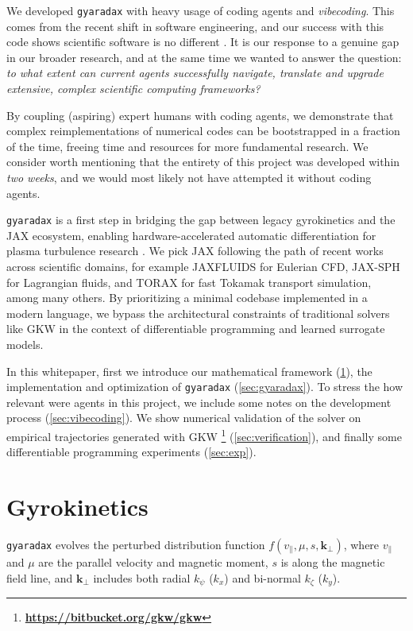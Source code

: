 \documentclass{article}
\theoremstyle{plain}
\theoremstyle{definition}
\theoremstyle{remark}
\begin{document}
We developed \texttt{gyaradax} with heavy usage of coding agents \cite{yang2024sweagentagentcomputerinterfacesenable} and \textit{vibecoding}. This comes from the recent shift in software engineering, and our success with this code shows scientific software is no different \cite{chen2025scienceagentbenchrigorousassessmentlanguage,duston2025ainsteinbenchbenchmarkingcodingagents}.
%
It is our response to a genuine gap in our broader research, and at the same time we wanted to answer the question: \textit{to what extent can current agents successfully navigate, translate and upgrade extensive, complex scientific computing frameworks?}

By coupling (aspiring) expert humans with coding agents, we demonstrate that complex reimplementations of numerical codes can be bootstrapped in a fraction of the time, freeing time and resources for more fundamental research.
%
We consider worth mentioning that the entirety of this project was developed within \textit{two weeks}, and we would most likely not have attempted it without coding agents.

\texttt{gyaradax} is a first step in bridging the gap between legacy gyrokinetics and the JAX ecosystem, enabling hardware-accelerated automatic differentiation for plasma turbulence research \cite{galletti20255dneuralsurrogatesnonlinear, paischer2025gyroswin}.
%
We pick JAX following the path of recent works across scientific domains, for example JAXFLUIDS \cite{Bezgin2023} for Eulerian CFD, JAX-SPH \cite{toshev2024jax} for Lagrangian fluids, and TORAX \cite{citrin2024toraxfastdifferentiabletokamak} for fast Tokamak transport simulation, among many others.
%
By prioritizing a minimal codebase implemented in a modern language, we bypass the architectural constraints of traditional solvers like GKW in the context of differentiable programming and learned surrogate models.

In this whitepaper, first we introduce our mathematical framework (\cref{sec:gyrokinetics}), the implementation and optimization of \texttt{gyaradax} (\cref{sec:gyaradax}). To stress the how relevant were agents in this project, we include some notes on the development process (\cref{sec:vibecoding}).
%
We show numerical validation of the solver on empirical trajectories generated with GKW \footnote{\textbf{\url{https://bitbucket.org/gkw/gkw}}} (\cref{sec:verification}),
and finally some differentiable programming experiments (\cref{sec:exp}).


\section{Gyrokinetics}
\label{sec:gyrokinetics}
\texttt{gyaradax} evolves the perturbed distribution function $f(v_\parallel, \mu, s, \mathbf{k}_\perp)$, where $v_\parallel$ and $\mu$ are the parallel velocity and magnetic moment, $s$ is along the magnetic field line, and $\mathbf{k}_\perp$ includes both radial $k_\psi$ ($k_x$) and bi-normal $k_\zeta$ ($k_y$).
\end{document}
